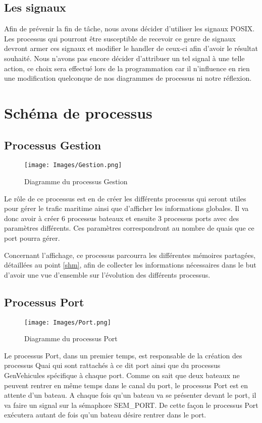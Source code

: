 \documentclass[a4paper, 11pt]{article}
\begin{document}
	\subsection{Les signaux}
		Afin de prévenir la fin de tâche, nous avons décider d'utiliser les signaux POSIX. Les processus qui pourront être susceptible de recevoir ce genre de signaux devront armer ces signaux et modifier le handler de ceux-ci afin d'avoir le résultat souhaité. Nous n'avons pas encore décider d'attribuer un tel signal à une telle action, ce choix sera effectué lors de la programmation car il n'influence en rien une modification quelconque de nos diagrammes de processus ni notre réflexion.
\newpage
\section{Schéma de processus}
	\subsection{Processus Gestion}
		\begin{figure}[!h]
			\centering
			\texttt{[image: Images/Gestion.png]}
			\caption{Diagramme du processus Gestion}
		\end{figure}
		Le rôle de ce processus est en de créer les différents processus qui seront utiles pour gérer le trafic maritime ainsi que d'afficher les informations globales. Il va donc avoir à créer 6 processus bateaux et ensuite 3 processus ports avec des paramètres différents. Ces paramètres correspondront au nombre de quais que ce port pourra gérer. 
		
		Concernant l'affichage, ce processus parcourra les différentes mémoires partagées, détaillées au point \ref{shm}, afin de collecter les informations nécessaires dans le but d'avoir une vue d'ensemble sur l'évolution des différents processus.
	\subsection{Processus Port}
		\begin{figure}[!h]
			\centering
			\texttt{[image: Images/Port.png]}
			\caption{Diagramme du processus Port}
		\end{figure}
		Le processus Port, dans un premier temps, est responsable de la création des processus Quai qui sont rattachés à ce dit port ainsi que du processus GenVehicules spécifique à chaque port. Comme on sait que deux bateaux ne peuvent rentrer en même temps dans le canal du port, le processus Port est en attente d'un bateau. A chaque fois qu'un bateau va se présenter devant le port, il va faire un signal sur la sémaphore SEM\_PORT. De cette façon le processus Port exécutera autant de fois qu'un bateau désire rentrer dans le port.
		
\end{document}
